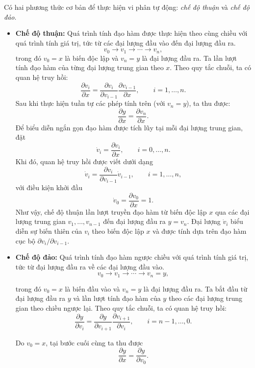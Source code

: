 Có hai phương thức cơ bản để thực hiện vi phân tự động: \emph{chế độ thuận} và \emph{chế độ đảo}.
\begin{itemize}
    \item \textbf{Chế độ thuận:} Quá trình tính đạo hàm được thực hiện theo cùng chiều với quá trình tính giá trị, tức từ các đại lượng đầu vào đến đại lượng đầu ra.
    \[v_0 \longrightarrow v_1 \longrightarrow \cdots
    \longrightarrow v_n,\]
    trong đó $v_0=x$ là biến độc lập và $v_n=y$ là đại lượng đầu ra. Ta lần lượt tính đạo hàm của từng đại lượng trung gian theo $x$. Theo quy tắc chuỗi, ta có quan hệ truy hồi:
    $$\frac{\partial v_i}{\partial x}
    =\frac{\partial v_i}{\partial v_{i-1}}
    \frac{\partial v_{i-1}}{\partial x},\qquad i=1,\ldots,n.$$
    Sau khi thực hiện tuần tự các phép tính trên (với $v_n=y$), ta thu được:
    $$\frac{\partial y}{\partial x}
    =\frac{\partial v_n}{\partial x}.$$
    Để biểu diễn ngắn gọn đạo hàm được tích lũy tại mỗi đại lượng trung gian, đặt
    \[\dot{v}_i=\frac{\partial v_i}{\partial x},\qquad i=0,\ldots,n.\]
    Khi đó, quan hệ truy hồi được viết dưới dạng
    \[\dot{v}_i=\frac{\partial v_i}{\partial v_{i-1}}
    \dot{v}_{i-1},\qquad i=1,\ldots,n,\]
    với điều kiện khởi đầu
    \[\dot{v}_0=\frac{\partial v_0}{\partial x}=1.\]
    Như vậy, chế độ thuận lần lượt truyền đạo hàm từ biến độc lập $x$ qua các đại lượng trung gian $v_1,\ldots,v_{n-1}$ đến đại lượng đầu ra $y=v_n$. Đại lượng $\dot{v}_i$ biểu diễn sự biến thiên của $v_i$ theo biến độc lập $x$ và được tính dựa trên đạo hàm cục bộ
    $\partial v_i/\partial v_{i-1}$.
    
    \item \textbf{Chế độ đảo:} Quá trình tính đạo hàm ngược chiều với quá trình tính giá trị, tức từ đại lượng đầu ra về các đại lượng đầu vào.
    \[v_0 \longrightarrow v_1 \longrightarrow \cdots\longrightarrow v_n = y,\]
    
    trong đó $v_0=x$ là biến đầu vào và $v_n=y$ là đại lượng đầu ra. Ta bắt đầu từ đại lượng đầu ra $y$ và lần lượt tính đạo hàm của $y$ theo các đại lượng trung gian theo chiều ngược lại. Theo quy tắc chuỗi, ta có quan hệ truy hồi:
    \begin{equation}
    \frac{\partial y}{\partial v_i}
    =\frac{\partial y}{\partial v_{i+1}}
    \frac{\partial v_{i+1}}{\partial v_i},\qquad i=n-1,\ldots,0.
    \end{equation}
    
    Do $v_0=x$, tại bước cuối cùng ta thu được
    \begin{equation}
    \frac{\partial y}{\partial x}=\frac{\partial y}{\partial v_0}.
    \end{equation}
    

\end{itemize}
